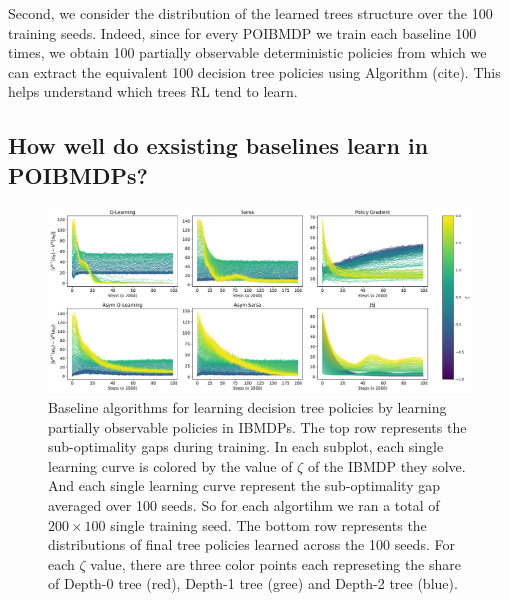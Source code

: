 Second, we consider the distribution of the learned trees structure over the 100 training seeds.
Indeed, since for every POIBMDP we train each baseline 100 times, we obtain 100 partially observable deterministic policies from which we can extract the equivalent 100 decision tree policies using Algorithm (cite).
This helps understand which trees RL tend to learn.

\subsection{How well do exsisting baselines learn in POIBMDPs?}

\begin{figure}
    \centering
    \includegraphics[width=1\textwidth]{images/images_part1/learning_curves.pdf}
    \caption{Baseline algorithms for learning decision tree policies by learning partially observable policies in IBMDPs. 
    The top row represents the sub-optimality gaps during training. In each subplot, each single learning curve is colored by the value of $\zeta$ of the IBMDP they solve. And each single learning curve represent the sub-optimality gap averaged over 100 seeds.
    So for each algortihm we ran a total of $200 \times 100$ single training seed.
    The bottom row represents the distributions of final tree policies learned across the 100 seeds.
    For each $\zeta$ value, there are three color points each represeting the share of Depth-0 tree (red), Depth-1 tree (gree) and Depth-2 tree (blue).
    }\label{fig:rl-poibmdp}
\end{figure}

